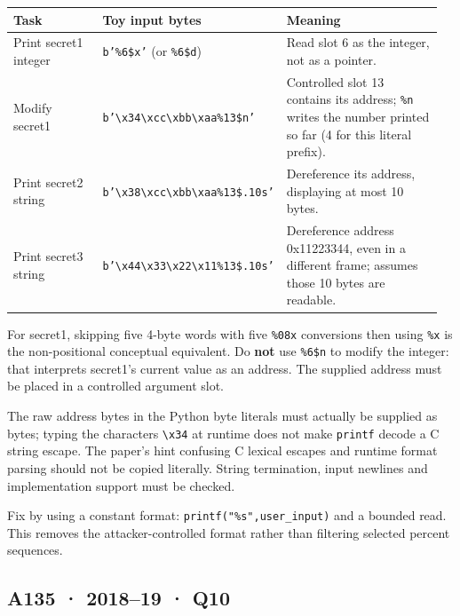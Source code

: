\documentclass[11pt,a4paper]{article}
\begin{document}
{\small\setlength{\tabcolsep}{3pt}
\begin{longtable}{>{\raggedright\arraybackslash}p{0.24618\linewidth}>{\raggedright\arraybackslash}p{0.27914\linewidth}>{\raggedright\arraybackslash}p{0.43311\linewidth}}
\toprule
\textbf{Task} & \textbf{Toy input bytes} & \textbf{Meaning} \\
\midrule
\endhead
Print secret1 integer & \texttt{b'\%6\$x'} (or \texttt{\%6\$d}) & Read slot 6 as the integer,\allowbreak{} not as a pointer. \\
Modify secret1 & \texttt{b'\textbackslash{}x34\textbackslash{}xcc\textbackslash{}xbb\textbackslash{}xaa\%13\$n'} & Controlled slot 13 contains its address; \texttt{\%n} writes the number printed so far (4 for this literal prefix). \\
Print secret2 string & \texttt{b'\textbackslash{}x38\textbackslash{}xcc\textbackslash{}xbb\textbackslash{}xaa\%13\$.10s'} & Dereference its address,\allowbreak{} displaying at most 10 bytes. \\
Print secret3 string & \texttt{b'\textbackslash{}x44\textbackslash{}x33\textbackslash{}x22\textbackslash{}x11\%13\$.10s'} & Dereference address 0x11223344,\allowbreak{} even in a different frame; assumes those 10 bytes are readable. \\
\bottomrule
\end{longtable}
}

For secret1,\allowbreak{} skipping five 4-byte words with five \texttt{\%08x} conversions then using \texttt{\%x} is the non-positional conceptual equivalent. Do \textbf{not} use \texttt{\%6\$n} to modify the integer: that interprets secret1's current value as an address. The supplied address must be placed in a controlled argument slot.


The raw address bytes in the Python byte literals must actually be supplied as bytes; typing the characters \texttt{\textbackslash{}x34} at runtime does not make \texttt{printf} decode a C string escape. The paper's hint confusing C lexical escapes and runtime format parsing should not be copied literally. String termination,\allowbreak{} input newlines and implementation support must be checked.


Fix by using a constant format: \texttt{printf("\%s",\allowbreak{}user\_input)} and a bounded read. This removes the attacker-controlled format rather than filtering selected percent sequences.




\clearpage
\subsection{A135 · 2018–19 · Q10}\label{a135}
\end{document}
